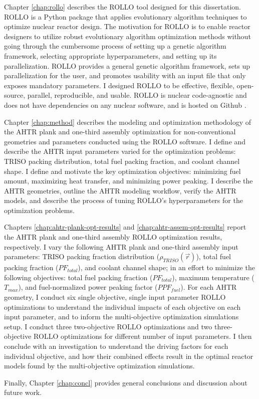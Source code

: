 Chapter \ref{chap:rollo} describes the \acrfull{ROLLO} tool designed for this 
dissertation. 
\gls{ROLLO} is a Python package that applies evolutionary algorithm 
techniques to optimize nuclear reactor design. 
The motivation for \gls{ROLLO} is to enable reactor designers to utilize 
robust evolutionary algorithm optimization methods without going 
through the cumbersome process of setting up a genetic algorithm framework,
selecting appropriate hyperparameters, and setting up its parallelization. 
\gls{ROLLO} provides a general genetic algorithm framework, sets up 
parallelization for the user, and promotes usability with an input file 
that only exposes mandatory parameters.
I designed  \gls{ROLLO} to be effective, flexible, open-source, parallel, 
reproducible, and usable. 
\gls{ROLLO} is nuclear code-agnostic and does not have dependencies on any 
nuclear software, and is hosted on Github \cite{chee_rollo_2021}. 

Chapter \ref{chap:method} describes the modeling and optimization methodology of the 
\gls{AHTR} plank and one-third assembly optimization for non-conventional 
geometries and parameters conducted using the \gls{ROLLO} software.
I define and describe the \gls{AHTR} input parameters varied for the optimization 
problems: \gls{TRISO} packing distribution, total fuel packing fraction, and 
coolant channel shape.
I define and motivate the key optimization objectives: minimizing fuel amount,
maximizing heat transfer, and minimizing power peaking.
I describe the \gls{AHTR} geometries, outline the \gls{AHTR} modeling workflow, 
verify the \gls{AHTR} models, and describe the process of tuning \gls{ROLLO}'s 
hyperparameters for the optimization problems.

Chapters \ref{chap:ahtr-plank-opt-results} and \ref{chap:ahtr-assem-opt-results} 
report the \gls{AHTR} plank and one-third assembly \gls{ROLLO} optimization results, 
respectively. 
I vary the following \gls{AHTR} plank and one-third assembly input parameters: 
\gls{TRISO} packing fraction distribution ($\rho_{TRISO}(\vec{r})$), total fuel 
packing fraction ($PF_{total}$), and coolant channel shape; in an effort to minimize 
the following objectives: total fuel packing fraction ($PF_{total}$), maximum 
temperature ($T_{max}$), and fuel-normalized power peaking factor ($PPF_{fuel}$). 
For each \gls{AHTR} geometry, I conduct six single objective, single input parameter 
\gls{ROLLO} optimizations to understand the individual impacts of each objective on 
each input parameter, and to inform the multi-objective optimization simulations setup. 
I conduct three two-objective \gls{ROLLO} optimizations and two three-objective 
\gls{ROLLO} optimizations for different number of input parameters. 
I then conclude with an investigation to understand the driving factors for each 
individual objective, and how their combined effects result in the optimal reactor 
models found by the multi-objective optimization simulations. 

Finally, Chapter \ref{chap:concl} provides general conclusions and discussion about 
future work. 